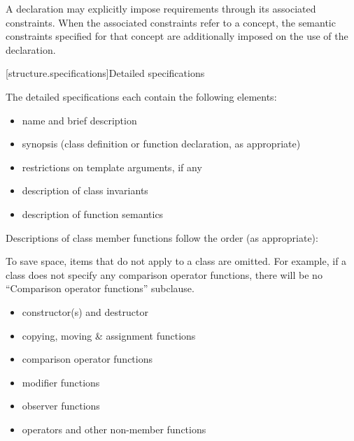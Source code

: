 \pnum
A declaration may explicitly impose requirements through its associated
constraints. When the associated constraints refer to a
concept, the semantic constraints specified for that concept
are additionally imposed on the use of the declaration.

[structure.specifications]{Detailed specifications}

\pnum
The detailed specifications each contain the following elements:%
\begin{itemize}
\item name and brief description
\item synopsis (class definition or function declaration, as appropriate)
\item restrictions on template arguments, if any
\item description of class invariants
\item description of function semantics
\end{itemize}

\pnum
Descriptions of class member functions follow the order (as
appropriate):
\begin{footnote}
To save space, items that do not apply to a class are omitted.
For example, if a class does not specify any comparison operator functions, there
will be no ``Comparison operator functions'' subclause.
\end{footnote}
\begin{itemize}
\item constructor(s) and destructor
\item copying, moving \& assignment functions
\item comparison operator functions
\item modifier functions
\item observer functions
\item operators and other non-member functions
\end{itemize}

